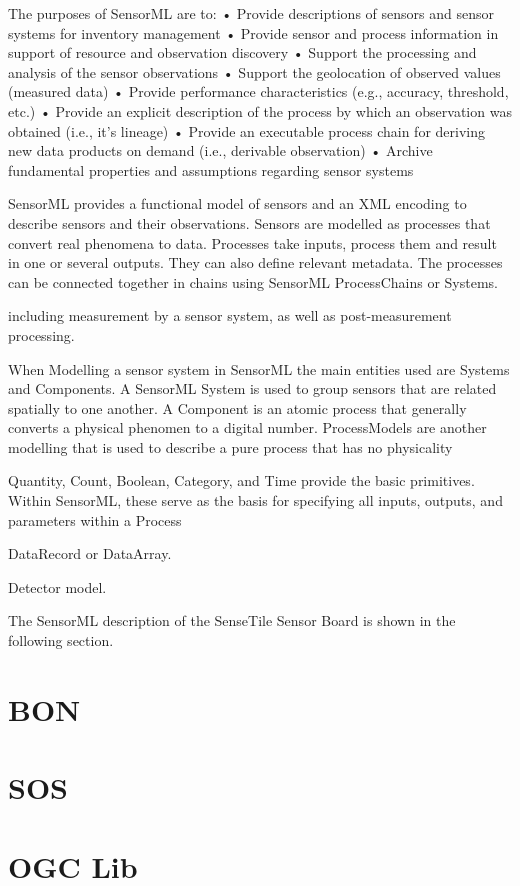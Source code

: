 \documentclass[]{final_report}
\begin{document}
The purposes of SensorML are to:
• Provide descriptions of sensors and sensor systems for inventory management
• Provide sensor and process information in support of resource and observation discovery
• Support the processing and analysis of the sensor observations
• Support the geolocation of observed values (measured data)
• Provide performance characteristics (e.g., accuracy, threshold, etc.)
• Provide an explicit description of the process by which an observation was obtained (i.e., it’s lineage)
• Provide an executable process chain for deriving new data products on demand (i.e., derivable observation)
• Archive fundamental properties and assumptions regarding sensor systems

SensorML provides a functional model of sensors and an XML encoding to describe sensors and their observations.
Sensors are modelled as processes that convert real phenomena to data. Processes take inputs, process them and result in one or several outputs. They can also define relevant metadata. The processes can be connected together in chains using SensorML ProcessChains or Systems. 

including measurement by a sensor system, as well as post-measurement
processing.

When Modelling a sensor system in SensorML the main entities used are Systems and Components. A SensorML System is used to group sensors that are related spatially to one another.  A Component is an atomic process that generally converts a physical phenomen to a digital number. ProcessModels are another modelling that is used to describe a pure process that has no physicality

Quantity, Count, Boolean, Category, and Time provide the basic primitives. Within SensorML, these serve as the basis for specifying all inputs, outputs, and parameters within a Process

DataRecord or DataArray.

Detector model.

The SensorML description of the SenseTile Sensor Board is shown in the following section.
\section{BON}
\section{SOS}
\section{OGC Lib}
\end{document}
